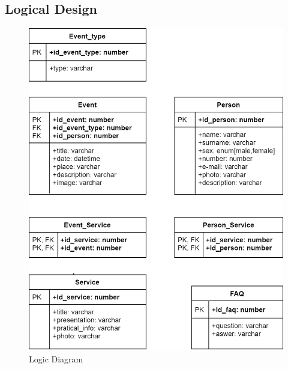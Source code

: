 \subsection{Logical Design}
\begin{figure}[h!]
		\centering
		\begin{minipage}[b]{1\textwidth}
    			\includegraphics[width=\textwidth]{./assets/logical_diagram.png}
			\caption{Logic Diagram}
		\end{minipage}
\end{figure}
\FloatBarrier